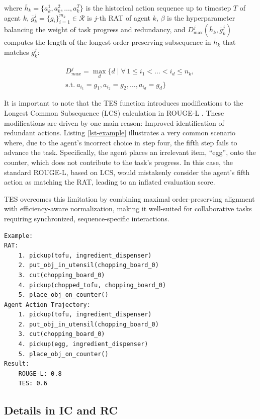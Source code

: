 \documentclass[11pt]{article}
\begin{document}
\noindent where $\overline{h}_k= \{a_k^1, a_k^2, \ldots, a_k^T\}$ is the historical action sequence up to timestep $T$ of agent $k$, $\overline{g}_k^j=\{g_i\}_{i=1}^{m_k} \in \mathcal{R}$ is $j$-th RAT of agent $k$, $\beta$ is the hyperparameter balancing the weight of task progress and redundancy, and $D_{\text{max}}^j(\overline{h}_k, \overline{g}_k^j)$ computes the length of the longest order-preserving subsequence in $\overline{h}_k$ that matches $\overline{g}_k^j$:  

\begin{multline}
     D_{max}^j = \max_d \{ d \mid \forall \, 1 \leq i_1 < \dots < i_d \leq n_k, \, \\
     \text{s.t.} \ a_{i_1} = g_1, a_{i_2} = g_2, \dots, a_{i_d} = g_d \}
\end{multline}


It is important to note that the TES function introduces modifications to the Longest Common Subsequence (LCS) calculation in ROUGE-L \cite{lin2004rouge}. These modifications are driven by one main reason: Improved identification of redundant actions. Listing \ref{lst-example} illustrates a very common scenario where, due to the agent’s incorrect choice in step four, the fifth step fails to advance the task. Specifically, the agent places an irrelevant item, ``egg'', onto the counter, which does not contribute to the task's progress. In this case, the standard ROUGE-L, based on LCS, would mistakenly consider the agent's fifth action as matching the RAT, leading to an inflated evaluation score.

TES overcomes this limitation by combining maximal order-preserving alignment with efficiency-aware normalization, making it well-suited for collaborative tasks requiring synchronized, sequence-specific interactions.


\begin{lstlisting}[caption={Comparison of TES with other functions},label={lst-example}]
Example:
RAT: 
    1. pickup(tofu, ingredient_dispenser)
    2. put_obj_in_utensil(chopping_board_0)
    3. cut(chopping_board_0)
    4. pickup(chopped_tofu, chopping_board_0)
    5. place_obj_on_counter()
Agent Action Trajectory: 
    1. pickup(tofu, ingredient_dispenser)
    2. put_obj_in_utensil(chopping_board_0)
    3. cut(chopping_board_0)
    4. pickup(egg, ingredient_dispenser)
    5. place_obj_on_counter()
Result:
    ROUGE-L: 0.8
    TES: 0.6
\end{lstlisting}

\subsection{Details in IC and RC}
\end{document}
